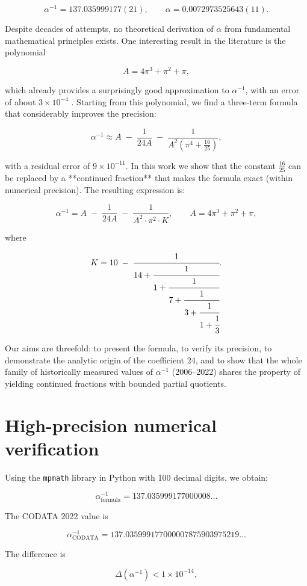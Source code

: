 \documentclass[12pt]{article}
\begin{document}
\[
\alpha^{-1} = 137.035999177(21), \qquad \alpha = 0.0072973525643(11).
\]

Despite decades of attempts, no theoretical derivation of $\alpha$ from fundamental mathematical principles exists. One interesting result in the literature is the polynomial

\[
A = 4\pi^3 + \pi^2 + \pi,
\]

which already provides a surprisingly good approximation to $\alpha^{-1}$, with an error of about $3\times10^{-4}$ \cite{nature2010, qaf2026}. Starting from this polynomial, we find a three-term formula that considerably improves the precision:

\[
\alpha^{-1} \approx A \;-\; \frac{1}{24A} \;-\; \frac{1}{A^2\left(\pi^4 + \frac{16}{25}\right)},
\]

with a residual error of $9\times10^{-11}$. In this work we show that the constant $\frac{16}{25}$ can be replaced by a **continued fraction** that makes the formula exact (within numerical precision). The resulting expression is:

\[
\boxed{
\alpha^{-1} = A \;-\; \frac{1}{24A} \;-\; \frac{1}{A^2 \cdot \pi^2 \cdot K}, \qquad A = 4\pi^3 + \pi^2 + \pi,
}
\]

where

\[
K = 10 \;-\; \cfrac{1}{14 + \cfrac{1}{1 + \cfrac{1}{7 + \cfrac{1}{3 + \cfrac{1}{1 + \cfrac{1}{3}}}}}}.
\]

Our aims are threefold: to present the formula, to verify its precision, to demonstrate the analytic origin of the coefficient $24$, and to show that the whole family of historically measured values of $\alpha^{-1}$ (2006–2022) shares the property of yielding continued fractions with bounded partial quotients.

\section{High-precision numerical verification}

Using the \texttt{mpmath} library in Python with 100 decimal digits, we obtain:

\[
\alpha^{-1}_{\text{formula}} = 137.035999177000008\ldots
\]

The CODATA 2022 value is

\[
\alpha^{-1}_{\text{CODATA}} = 137.035999177000007875903975219\ldots
\]

The difference is

\[
\Delta(\alpha^{-1}) < 1\times10^{-14},
\]
\end{document}

